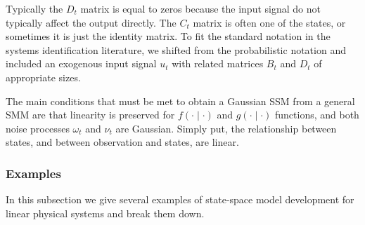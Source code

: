 Typically the \(D_t\) matrix is equal to zeros because the input signal do not typically affect the output directly. The \(C_t\) matrix is often one of the states, or sometimes it is just the identity matrix. To fit the standard notation in the systems identification literature, we shifted from the probabilistic notation and included an exogenous input signal \(u_t\) with related matrices \(B_t\) and \(D_t\) of appropriate sizes.

The main conditions that must be met to obtain a Gaussian SSM from a general SMM are that linearity is preserved for \(f(\cdot \mid \cdot)\) and \(g(\cdot \mid \cdot )\) functions, and both noise processes \(\omega_t\) and \(\nu_t\) are Gaussian. Simply put, the relationship between states, and between observation and states, are linear.

\subsubsection{Examples}

In this subsection we give several examples of state-space model development for linear physical systems and break them down.

